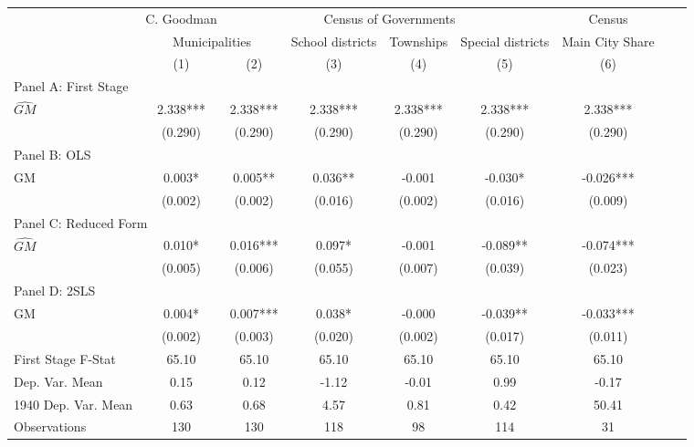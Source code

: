  \begin{tabular}{l*{8}{c}} \toprule
&\multicolumn{1}{c}{C. Goodman}&\multicolumn{4}{c}{Census of Governments}&\multicolumn{1}{c}{Census}\\\cmidrule(lr){2-2}\cmidrule(lr){3-6}\cmidrule(lr){7-7}
&\multicolumn{2}{c}{Municipalities}&\multicolumn{1}{c}{School districts}&\multicolumn{1}{c}{Townships}&\multicolumn{1}{c}{Special districts}&\multicolumn{1}{c}{Main City Share}\\\cmidrule(lr){2-3}\cmidrule(lr){4-6}\cmidrule(lr){7-7}
&\multicolumn{1}{c}{(1)}&\multicolumn{1}{c}{(2)}&\multicolumn{1}{c}{(3)}&\multicolumn{1}{c}{(4)}&\multicolumn{1}{c}{(5)}&\multicolumn{1}{c}{(6)}\\
\cmidrule(lr){1-7}
\multicolumn{6}{l}{Panel A: First Stage}\\
\cmidrule(lr){1-7}
$\widehat{GM}$  &    2.338***&    2.338***&    2.338***&    2.338***&    2.338***&    2.338***\\
                &  (0.290)   &  (0.290)   &  (0.290)   &  (0.290)   &  (0.290)   &  (0.290)   \\
\cmidrule(lr){1-7}
\multicolumn{6}{l}{Panel B: OLS}\\
\cmidrule(lr){1-7}
GM              &    0.003*  &    0.005** &    0.036** &   -0.001   &   -0.030*  &   -0.026***\\
                &  (0.002)   &  (0.002)   &  (0.016)   &  (0.002)   &  (0.016)   &  (0.009)   \\
\cmidrule(lr){1-7}
\multicolumn{6}{l}{Panel C: Reduced Form}\\
\cmidrule(lr){1-7}
$\widehat{GM}$  &    0.010*  &    0.016***&    0.097*  &   -0.001   &   -0.089** &   -0.074***\\
                &  (0.005)   &  (0.006)   &  (0.055)   &  (0.007)   &  (0.039)   &  (0.023)   \\
\cmidrule(lr){1-7}
\multicolumn{6}{l}{Panel D: 2SLS}\\
\cmidrule(lr){1-7}
GM              &    0.004*  &    0.007***&    0.038*  &   -0.000   &   -0.039** &   -0.033***\\
                &  (0.002)   &  (0.003)   &  (0.020)   &  (0.002)   &  (0.017)   &  (0.011)   \\
\midrule
First Stage F-Stat&    65.10   &    65.10   &    65.10   &    65.10   &    65.10   &    65.10   \\
Dep. Var. Mean  &     0.15   &     0.12   &    -1.12   &    -0.01   &     0.99   &    -0.17   \\
1940 Dep. Var. Mean&     0.63   &     0.68   &     4.57   &     0.81   &     0.42   &    50.41   \\
Observations    &      130   &      130   &      118   &       98   &      114   &       31   \\
       \bottomrule \end{tabular}
